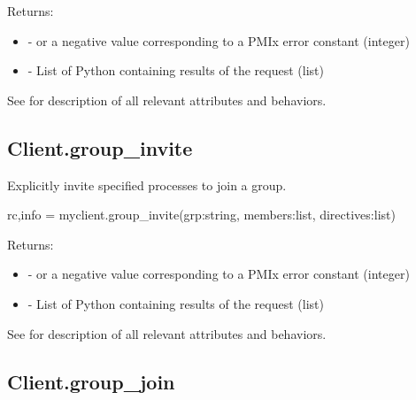 Returns:

\begin{itemize}
    \item {} -  or a negative value corresponding to a PMIx error constant (integer)
    \item {} - List of Python  containing results of the request (list)
\end{itemize}

See  for description of all relevant attributes and behaviors.


\subsection{Client.group_invite}

\summary

Explicitly invite specified processes to join a group.

\format

\pyspecificstart
\begin{codepar}
rc,info = myclient.group_invite(grp:string,
                        members:list, directives:list)
\end{codepar}
\pyspecificend

\begin{arglist}
\end{arglist}

Returns:

\begin{itemize}
    \item {} -  or a negative value corresponding to a PMIx error constant (integer)
    \item {} - List of Python  containing results of the request (list)
\end{itemize}

See  for description of all relevant attributes and behaviors.


\subsection{Client.group_join}

